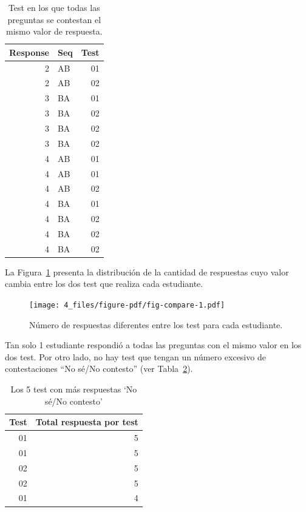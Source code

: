 \documentclass[
  12pt,
  a4paper,
  extrafontsizes,
  onecolumn,
  openright,
  table]{memoir}
\begin{document}
\hypertarget{tbl-distinct2}{}
\begin{longtable}{rlr}
\caption{\label{tbl-distinct2}Test en los que todas las preguntas se contestan el mismo valor de
respuesta. }\tabularnewline

\toprule
Response & Seq & Test \\ 
\midrule
2 & AB & 01 \\ 
2 & AB & 02 \\ 
3 & BA & 01 \\ 
3 & BA & 02 \\ 
3 & BA & 02 \\ 
3 & BA & 02 \\ 
4 & AB & 01 \\ 
4 & AB & 01 \\ 
4 & AB & 02 \\ 
4 & BA & 01 \\ 
4 & BA & 02 \\ 
4 & BA & 02 \\ 
4 & BA & 02 \\ 
\bottomrule
\end{longtable}

La Figura~\ref{fig-compare} presenta la distribución de la cantidad de
respuestas cuyo valor cambia entre los dos test que realiza cada
estudiante.

\begin{figure}[h]

{\centering \texttt{[image: 4\_files/figure-pdf/fig-compare-1.pdf]}

}

\caption{\label{fig-compare}Número de respuestas diferentes entre los
test para cada estudiante.}

\end{figure}

Tan solo 1 estudiante respondió a todas las preguntas con el mismo valor
en los dos test. Por otro lado, no hay test que tengan un número
excesivo de contestaciones \enquote{No sé/No contesto} (ver
Tabla~\ref{tbl-noanswer}).

\hypertarget{tbl-noanswer}{}
\begin{longtable}{rr}
\caption{\label{tbl-noanswer}Los 5 test con más respuestas `No sé/No contesto' }\tabularnewline

\toprule
Test & Total respuesta por test \\ 
\midrule
01 & 5 \\ 
01 & 5 \\ 
02 & 5 \\ 
02 & 5 \\ 
01 & 4 \\ 
\bottomrule
\end{longtable}
\end{document}
